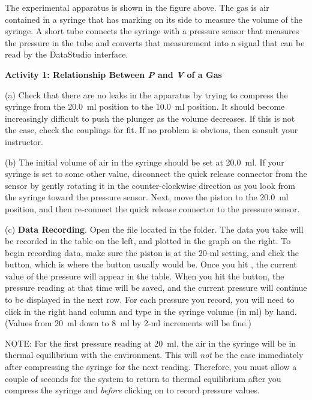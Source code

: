 The experimental apparatus is shown in the figure above. The gas is air contained
in a syringe that has marking on its side to measure the volume of the syringe.
A short tube connects the syringe with a pressure sensor that measures the pressure
in the tube and converts that measurement into a signal that can be read by
the DataStudio interface.

\textbf{Activity 1: Relationship Between \textit{P} and \textit{V} of a Gas}

(a) Check that there are no leaks in the apparatus by trying to compress
the syringe from the 20.0~ml position to the 10.0~ml position. It should become
increasingly difficult to push the plunger as the volume decreases. If this
is not the case, check the couplings for fit. If no problem is obvious, then
consult your instructor. 
\vspace{20mm}

(b) The initial volume of air in the syringe should be set at 20.0~ml. If your
syringe is set to some other value, disconnect the quick release connector from
the sensor by gently rotating it in the counter-clockwise direction as you look
from the syringe toward the pressure sensor. Next, move the piston to the
20.0~ml position, and then re-connect the quick release connector to the pressure
sensor. 

(c) \textbf{Data Recording}. Open the file  located in the 
\filename{\coursefolder} folder.  The data you take will be recorded in the table on the left, and plotted in the graph on the right.  To begin recording data, make sure the piston is at the 20-ml setting, and click
the  button, which is where the  button usually would be. 
Once you hit , the current value of the pressure will appear in the table.  
When you hit the  button, the pressure reading at that time will be saved, and the current pressure will continue to be displayed in the next row.  For each pressure you record, you will need to click in the right hand column and type in the syringe volume (in ml) by hand.  (Values from 20~ml down to 8~ml by 2-ml increments will be fine.)

NOTE: For the first pressure reading at 20~ml, the air in the syringe will be
in thermal equilibrium with the environment. This will \textit{not} be the case immediately
after compressing the syringe for the next reading. Therefore, you must allow
a couple of seconds for the system to return to thermal equilibrium after you 
compress the syringe and \textit{before} clicking on  to record pressure values. 

